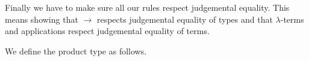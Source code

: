 \begin{defin}[{Congruence rules]

    Finally we have to make sure all our rules respect judgemental equality. This means showing that $\to$ respects judgemental equality of types and that $\lambda$-terms and applications respect judgemental equality of terms.

    \begin{prooftree}
    \end{prooftree}

    \begin{prooftree}
    \end{prooftree}

    \begin{prooftree}
    \end{prooftree}

\end{defin}

We define the product type as follows.

